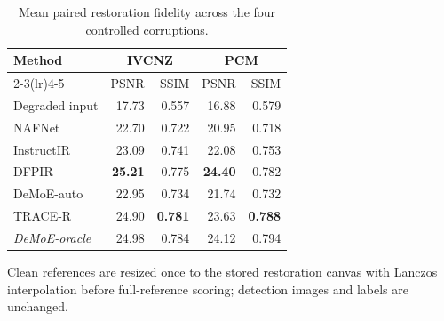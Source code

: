 \begin{table}[!t]
\centering
\caption{Mean paired restoration fidelity across the four controlled corruptions.}
\label{tab:fidelity}
\scriptsize
\begin{tabular}{lrrrr}
\toprule
Method & \multicolumn{2}{c}{IVCNZ} & \multicolumn{2}{c}{PCM} \\
\cmidrule(lr){2-3}\cmidrule(lr){4-5}
 & PSNR & SSIM & PSNR & SSIM \\
\midrule
Degraded input & 17.73 & 0.557 & 16.88 & 0.579 \\
NAFNet & 22.70 & 0.722 & 20.95 & 0.718 \\
InstructIR & 23.09 & 0.741 & 22.08 & 0.753 \\
DFPIR & \textbf{25.21} & 0.775 & \textbf{24.40} & 0.782 \\
DeMoE-auto & 22.95 & 0.734 & 21.74 & 0.732 \\
TRACE-R & 24.90 & \textbf{0.781} & 23.63 & \textbf{0.788} \\
\emph{DeMoE-oracle} & 24.98 & 0.784 & 24.12 & 0.794 \\
\bottomrule
\end{tabular}
\vspace{1mm}
\parbox{0.97\textwidth}{\scriptsize Clean references are resized once to the stored restoration canvas with Lanczos interpolation before full-reference scoring; detection images and labels are unchanged.}
\end{table}

